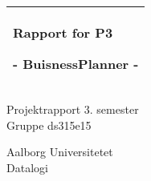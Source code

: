 %
\begin{titlepage}
  \addtolength{\hoffset}{0.5\evensidemargin-0.5\oddsidemargin} %
  \noindent%
  \begin{tabular}{@{}p{\textwidth}@{}}
    \toprule[2pt]
    \midrule
    \vspace{0.2cm}
    \begin{center}
    \Huge{\textbf{
      Rapport for P3%
    }}
    \end{center}
    \begin{center}
      \Large{
        - BuisnessPlanner -%
      }
    \end{center}
    \vspace{0.2cm}\\
    \midrule
    \toprule[2pt]
  \end{tabular}
  \vspace{4 cm}
  \begin{center}
    {\large
      Projektrapport 3. semester%
    }\\
    \vspace{0.2cm}
    {\Large
      Gruppe ds315e15%
    }
  \end{center}
  \vfill
  \begin{center}
  Aalborg Universitetet\\
  Datalogi
  \end{center}
\end{titlepage}
\clearpage
